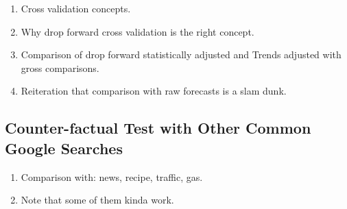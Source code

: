 \documentclass{article}
\begin{document}
  
    \begin{enumerate}
      \item Cross validation concepts.
      \item Why drop forward cross validation is the right concept.
      \item Comparison of drop forward statistically adjusted and Trends adjusted with gross comparisons.
      \item Reiteration that comparison with raw forecasts is a slam dunk.
    \end{enumerate}
    
  \subsection{Counter-factual Test with Other Common Google Searches}
  
  
  
    \begin{enumerate}
      \item Comparison with: news, recipe, traffic, gas.
      \item Note that some of them kinda work.
    \end{enumerate}
    
\end{document}

